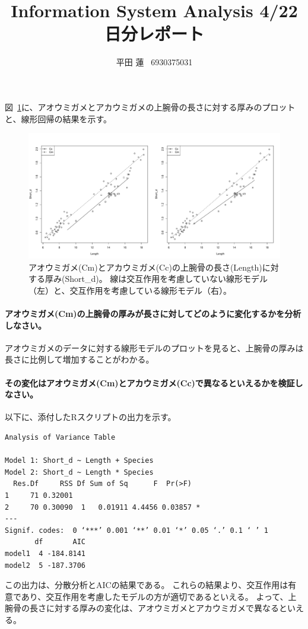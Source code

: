 \documentclass{jsarticle}
\title{Information System Analysis 4/22日分レポート}
\author{平田 蓮 \ 6930375031}
\begin{document}
\maketitle

図~\ref{fig:lms}に、アオウミガメとアカウミガメの上腕骨の長さに対する厚みのプロットと、線形回帰の結果を示す。

\begin{figure}[h]
    \centering
    \includegraphics[width=\hsize]{lms.pdf}
    \caption{
        アオウミガメ(Cm)とアカウミガメ(Cc)の上腕骨の長さ(Length)に対する厚み(Short\_d)。
        線は交互作用を考慮していない線形モデル（左）と、交互作用を考慮している線形モデル（右）。
    }
    \label{fig:lms}
\end{figure}

\paragraph{アオウミガメ(Cm)の上腕骨の厚みが長さに対してどのように変化するかを分析しなさい。}
    アオウミガメのデータに対する線形モデルのプロットを見ると、上腕骨の厚みは長さに比例して増加することがわかる。

\paragraph{その変化はアオウミガメ(Cm)とアカウミガメ(Cc)で異なるといえるかを検証しなさい。}
    以下に、添付したRスクリプトの出力を示す。

    \begin{verbatim}
Analysis of Variance Table

Model 1: Short_d ~ Length + Species
Model 2: Short_d ~ Length * Species
  Res.Df     RSS Df Sum of Sq      F  Pr(>F)  
1     71 0.32001                              
2     70 0.30090  1   0.01911 4.4456 0.03857 *
---
Signif. codes:  0 ‘***’ 0.001 ‘**’ 0.01 ‘*’ 0.05 ‘.’ 0.1 ‘ ’ 1
       df       AIC
model1  4 -184.8141
model2  5 -187.3706
    \end{verbatim}

    この出力は、分散分析とAICの結果である。
    これらの結果より、交互作用は有意であり、交互作用を考慮したモデルの方が適切であるといえる。
    よって、上腕骨の長さに対する厚みの変化は、アオウミガメとアカウミガメで異なるといえる。
\end{document}
